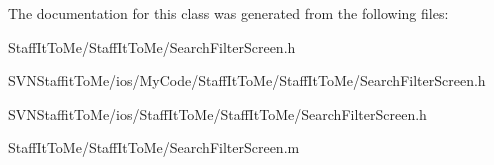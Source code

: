 \-The documentation for this class was generated from the following files\-:\begin{DoxyCompactItemize}
\item 
\-Staff\-It\-To\-Me/\-Staff\-It\-To\-Me/\-Search\-Filter\-Screen.\-h\item 
\-S\-V\-N\-Staffit\-To\-Me/ios/\-My\-Code/\-Staff\-It\-To\-Me/\-Staff\-It\-To\-Me/\-Search\-Filter\-Screen.\-h\item 
\-S\-V\-N\-Staffit\-To\-Me/ios/\-Staff\-It\-To\-Me/\-Staff\-It\-To\-Me/\-Search\-Filter\-Screen.\-h\item 
\-Staff\-It\-To\-Me/\-Staff\-It\-To\-Me/\-Search\-Filter\-Screen.\-m\end{DoxyCompactItemize}
